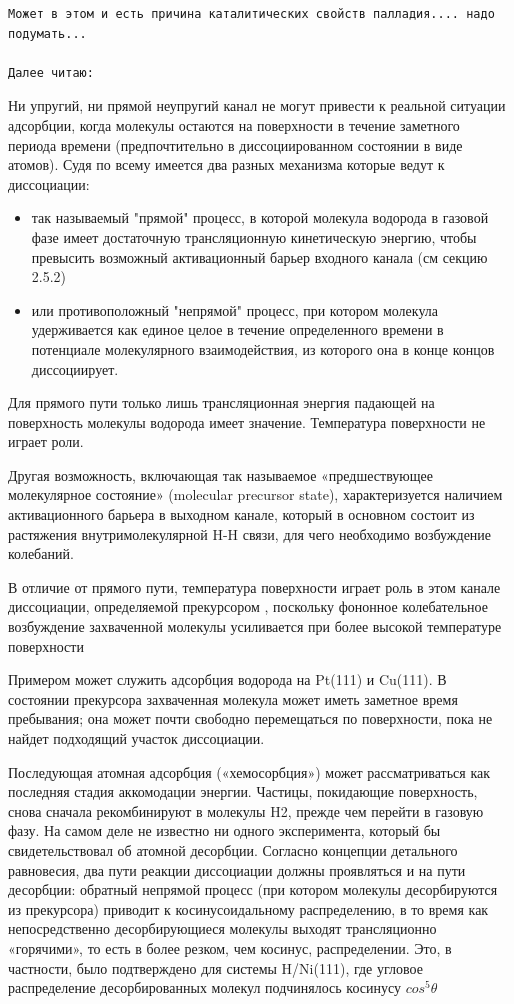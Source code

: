 \documentclass[11pt]{article}
\begin{document}
    \begin{verbatim}
Может в этом и есть причина каталитических свойств палладия.... надо подумать...

Далее читаю:
\end{verbatim}

    Ни упругий, ни прямой неупругий канал не могут привести к реальной
ситуации адсорбции, когда молекулы остаются на поверхности в течение
заметного периода времени (предпочтительно в диссоциированном состоянии
в виде атомов). Судя по всему имеется два разных механизма которые ведут
к диссоциации:

\begin{itemize}
\item
  так называемый "прямой" процесс, в которой молекула водорода в газовой
  фазе имеет достаточную трансляционную кинетическую энергию, чтобы
  превысить возможный активационный барьер входного канала (см секцию
  2.5.2)
\item
  или противоположный "непрямой" процесс, при котором молекула
  удерживается как единое целое в течение определенного времени в
  потенциале молекулярного взаимодействия, из которого она в конце
  концов диссоциирует.
\end{itemize}

Для прямого пути только лишь трансляционная энергия падающей на
поверхность молекулы водорода имеет значение. Температура поверхности не
играет роли.

Другая возможность, включающая так называемое «предшествующее
молекулярное состояние» (molecular precursor state), характеризуется
наличием активационного барьера в выходном канале, который в основном
состоит из растяжения внутримолекулярной H-H связи, для чего необходимо
возбуждение колебаний.

В отличие от прямого пути, температура поверхности играет роль в этом
канале диссоциации, определяемой прекурсором , поскольку фононное
колебательное возбуждение захваченной молекулы усиливается при более
высокой температуре поверхности

Примером может служить адсорбция водорода на Pt(111) и Cu(111). В
состоянии прекурсора захваченная молекула может иметь заметное время
пребывания; она может почти свободно перемещаться по поверхности, пока
не найдет подходящий участок диссоциации.

Последующая атомная адсорбция («хемосорбция») может рассматриваться как
последняя стадия аккомодации энергии. Частицы, покидающие поверхность,
снова сначала рекомбинируют в молекулы H2, прежде чем перейти в газовую
фазу. На самом деле не известно ни одного эксперимента, который бы
свидетельствовал об атомной десорбции. Согласно концепции детального
равновесия, два пути реакции диссоциации должны проявляться и на пути
десорбции: обратный непрямой процесс (при котором молекулы десорбируются
из прекурсора) приводит к косинусоидальному распределению, в то время
как непосредственно десорбирующиеся молекулы выходят трансляционно
«горячими», то есть в более резком, чем косинус, распределении. Это, в
частности, было подтверждено для системы H/Ni(111), где угловое
распределение десорбированных молекул подчинялось косинусу
\(cos^5 \theta\)
\end{document}
